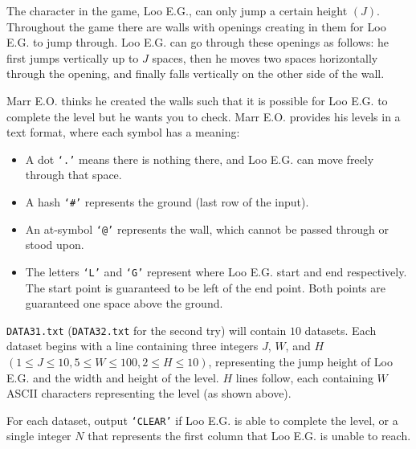 \documentclass{problem-set}
\begin{document}
The character in the game, Loo E.G., can only jump a certain height $(J)$. Throughout the game there are walls with openings creating in them for Loo E.G. to jump through. Loo E.G. can go through these openings as follows: he first jumps vertically up to $J$ spaces, then he moves two spaces horizontally through the opening, and finally falls vertically on the other side of the wall.

Marr E.O. thinks he created the walls such that it is possible for Loo E.G. to complete the level but he wants you to check. Marr E.O. provides his levels in a text format, where each symbol has a meaning:
\begin{itemize}
    \item A dot \texttt{`.'} means there is nothing there, and Loo E.G. can move freely through that space.
    \item A hash \texttt{`\#'} represents the ground (last row of the input).
    \item An at-symbol \texttt{`@'} represents the wall, which cannot be passed through or stood upon.
    \item The letters \texttt{`L'} and \texttt{`G'} represent where Loo E.G. start and end respectively. The start point is guaranteed to be left of the end point. Both points are guaranteed one space above the ground.
\end{itemize}

\texttt{DATA31.txt} (\texttt{DATA32.txt} for the second try) will contain $10$ datasets. Each dataset begins with a line containing three integers $J$, $W$, and $H$ $(1 \leq J \leq 10, 5 \leq W \leq 100, 2 \leq H \leq 10)$, representing the jump height of Loo E.G. and the width and height of the level. $H$ lines follow, each containing $W$ ASCII characters representing the level (as shown above).

\outputformat
For each dataset, output \texttt{`CLEAR'} if Loo E.G. is able to complete the level, or a single integer $N$ that represents the first column that Loo E.G. is unable to reach.

\pushnewpage
{}

\end{document}
